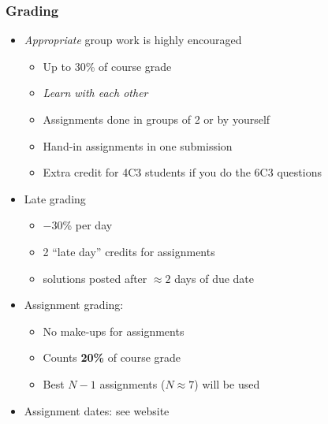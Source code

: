 \begin{frame}\frametitle{Grading}
	
	\begin{itemize}
		\item	\emph{Appropriate} group work is highly encouraged 
		\begin{itemize}
			\item	Up to 30\% of course grade 
			\item	\emph{Learn with each other} 
			\item	Assignments done in groups of 2 or by yourself 
			\item	Hand-in assignments in one submission 
			\item	Extra credit for 4C3 students if you do the 6C3 questions
		\end{itemize}
		\item	Late grading 
		\begin{itemize}
			\item	\( -30 \)\% per day
			\item	2 ``late day'' credits for assignments 
			\item	solutions posted after $\approx 2$ days of due date 
		\end{itemize}
		\item	Assignment grading: 
		\begin{itemize}
			\item	No make-ups for assignments 
			\item	Counts \textbf{20\%} of course grade 
			\item	Best $N-1$ assignments ($N \approx 7$) will be used 
		\end{itemize}
		\item	Assignment dates: see website 
	\end{itemize}
\end{frame}

